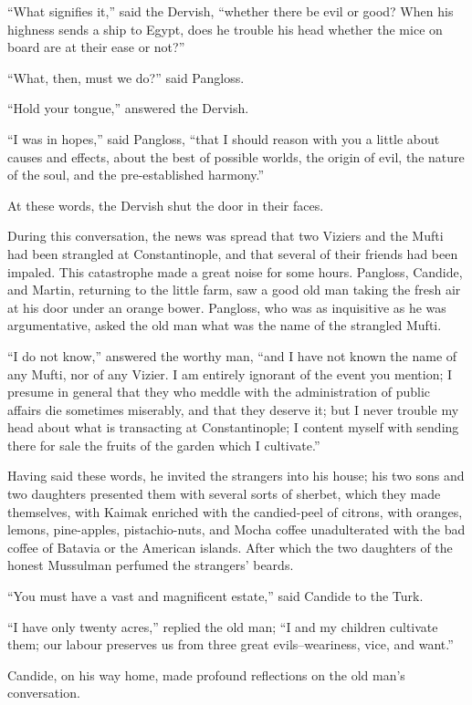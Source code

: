 ``What signifies it,'' said the Dervish, ``whether there be evil or good? When his highness sends a ship to Egypt, does he trouble his head whether the mice on board are at their ease or not?''

``What, then, must we do?'' said Pangloss.

``Hold your tongue,'' answered the Dervish.

``I was in hopes,'' said Pangloss, ``that I should reason with you a little about causes and effects, about the best of possible worlds, the origin of evil, the nature of the soul, and the pre-established harmony.''

At these words, the Dervish shut the door in their faces.

During this conversation, the news was spread that two Viziers and the Mufti had been strangled at Constantinople, and that several of their friends had been impaled. This catastrophe made a great noise for some hours. Pangloss, Candide, and Martin, returning to the little farm, saw a good old man taking the fresh air at his door under an orange bower. Pangloss, who was as inquisitive as he was argumentative, asked the old man what was the name of the strangled Mufti.

``I do not know,'' answered the worthy man, ``and I have not known the name of any Mufti, nor of any Vizier. I am entirely ignorant of the event you mention; I presume in general that they who meddle with the administration of public affairs die sometimes miserably, and that they deserve it; but I never trouble my head about what is transacting at Constantinople; I content myself with sending there for sale the fruits of the garden which I cultivate.''

Having said these words, he invited the strangers into his house; his two sons and two daughters presented them with several sorts of sherbet, which they made themselves, with Kaimak enriched with the candied-peel of citrons, with oranges, lemons, pine-apples, pistachio-nuts, and Mocha coffee unadulterated with the bad coffee of Batavia or the American islands. After which the two daughters of the honest Mussulman perfumed the strangers' beards.

``You must have a vast and magnificent estate,'' said Candide to the Turk.

``I have only twenty acres,'' replied the old man; ``I and my children cultivate them; our labour preserves us from three great evils--weariness, vice, and want.''

Candide, on his way home, made profound reflections on the old man's conversation.

